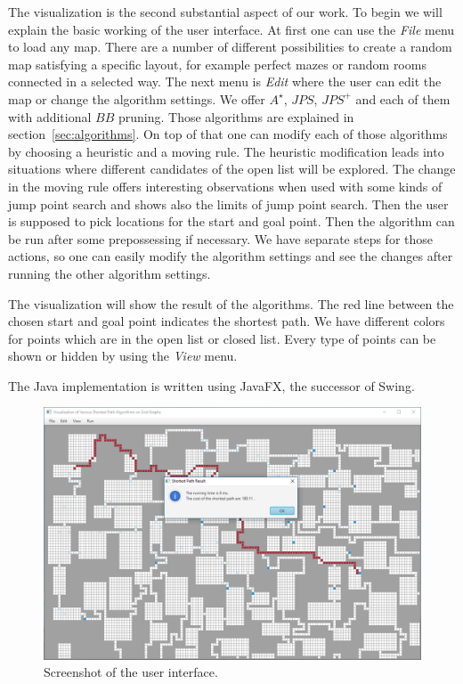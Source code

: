 \documentclass{article}
\begin{document}
    The visualization is the second substantial aspect of our work. To begin we will explain the basic working of the user interface. At first one can use the \textit{File} menu to load any map. There are a number of different possibilities to create a random map satisfying a specific layout, for example perfect mazes or random rooms connected in a selected way. The next menu is \textit{Edit} where the user can edit the map or change the algorithm settings. We offer $A^\star$, $JPS$, $JPS^+$ and each of them with additional $BB$ pruning. Those algorithms are explained in section~\ref{sec:algorithms}. On top of that one can modify each of those algorithms by choosing a heuristic and a moving rule. The heuristic modification leads into situations where different candidates of the open list will be explored. The change in the moving rule offers interesting observations when used with some kinds of jump point search and shows also the limits of jump point search. Then the user is supposed to pick locations for the start and goal point. Then the algorithm can be run after some prepossessing if necessary. We have separate steps for those actions, so one can easily modify the algorithm settings and see the changes after running the other algorithm settings.

    The visualization will show the result of the algorithms. The red line between the chosen start and goal point indicates the shortest path. We have different colors for points which are in the open list or closed list. Every type of points can be shown or hidden by using the \textit{View} menu.

    The Java implementation is written using JavaFX, the successor of Swing.

    \begin{figure}[!htb]
        \centering
        \includegraphics[width=\textwidth]{figures/javafx.png}
        \caption{Screenshot of the user interface.}
        \label{fig:javafx}
    \end{figure}
\end{document}
